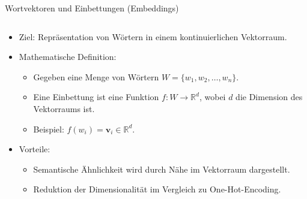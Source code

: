\documentclass[aspectratio=1610, xcolor=dvipsnames, 9pt]{beamer}
\begin{document}
\begin{frame}{Wortvektoren und Einbettungen (Embeddings)}
  \begin{columns}
    \begin{column}{1\textwidth}
      \begin{itemize}
        \item Ziel: Repräsentation von Wörtern in einem kontinuierlichen Vektorraum.
        \vspace{0.5cm}
        \item Mathematische Definition:
          \begin{itemize}
            \item Gegeben eine Menge von Wörtern \( W = \{w_1, w_2, \dots, w_n\} \).
            \item Eine Einbettung ist eine Funktion \( f: W \to \mathbb{R}^d \), wobei \( d \) die Dimension des Vektorraums ist.
            \item Beispiel: \( f(w_i) = \mathbf{v}_i \in \mathbb{R}^d \).
          \end{itemize}
          \vspace{0.5cm}
        \item Vorteile:
          \begin{itemize}
            \item Semantische Ähnlichkeit wird durch Nähe im Vektorraum dargestellt.
            \item Reduktion der Dimensionalität im Vergleich zu One-Hot-Encoding.
          \end{itemize}
      \end{itemize}
    \end{column}
  \end{columns}
\end{frame}
\end{document}
